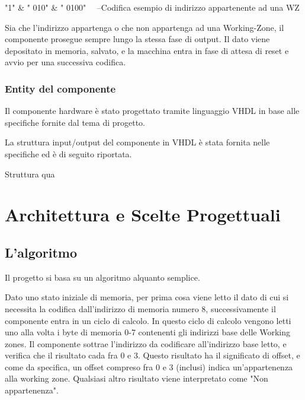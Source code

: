 \documentclass{article}
\newenvironment{gitFont}{\fontfamily{zi4}\selectfont}{\par}
\begin{document}
\begin{gitFont}

"1" \& " 010" \& " 0100"  \ \ --Codifica esempio di indirizzo appartenente ad una WZ

\end{gitFont}


\bigskip

Sia che l'indirizzo appartenga o che non appartenga ad una Working-Zone, il componente prosegue sempre lungo la stessa fase di output. Il dato viene depositato in memoria, salvato, e la macchina entra in fase di attesa di reset e avvio per una successiva codifica.

\subsubsection{Entity del componente}

Il componente hardware è stato progettato tramite linguaggio VHDL in base alle specifiche fornite dal tema di progetto.

La struttura input/output del componente in VHDL è stata fornita nelle specifiche ed è di seguito riportata.

\begin{gitFont} Struttura qua \end{gitFont}




\section{Architettura e Scelte Progettuali}

\subsection{L'algoritmo}

Il progetto si basa su un algoritmo alquanto semplice. 

Dato uno stato iniziale di memoria, per prima cosa viene letto il dato di cui si necessita la codifica dall'indirizzo di memoria numero 8, successivamente il componente entra in un ciclo di calcolo. In questo ciclo di calcolo vengono letti uno alla volta i byte di memoria 0-7 contenenti gli indirizzi base delle Working zones. Il componente sottrae l'indirizzo da codificare all'indirizzo base letto, e verifica che il risultato cada fra 0 e 3. Questo risultato ha il significato di offset, e come da specifica, un offset compreso fra 0 e 3 (inclusi) indica un'appartenenza alla working zone. Qualsiasi altro risultato viene interpretato come "Non appartenenza".
\end{document}
